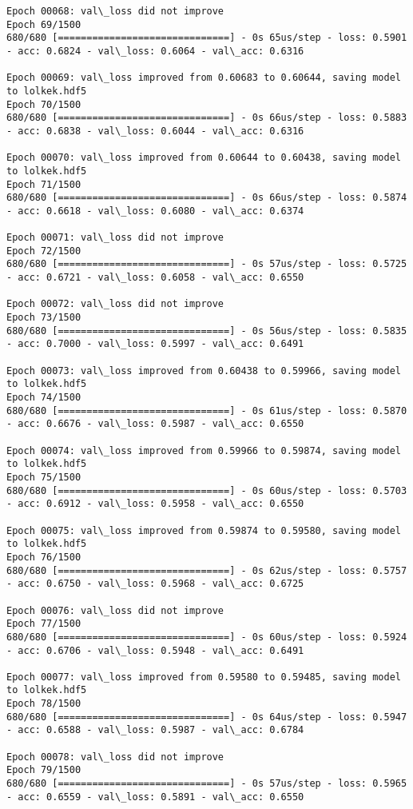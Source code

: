 \documentclass[11pt]{article}
\begin{document}
\begin{Verbatim}[commandchars=\\\{\}]
Epoch 00068: val\_loss did not improve
Epoch 69/1500
680/680 [==============================] - 0s 65us/step - loss: 0.5901 - acc: 0.6824 - val\_loss: 0.6064 - val\_acc: 0.6316

Epoch 00069: val\_loss improved from 0.60683 to 0.60644, saving model to lolkek.hdf5
Epoch 70/1500
680/680 [==============================] - 0s 66us/step - loss: 0.5883 - acc: 0.6838 - val\_loss: 0.6044 - val\_acc: 0.6316

Epoch 00070: val\_loss improved from 0.60644 to 0.60438, saving model to lolkek.hdf5
Epoch 71/1500
680/680 [==============================] - 0s 66us/step - loss: 0.5874 - acc: 0.6618 - val\_loss: 0.6080 - val\_acc: 0.6374

Epoch 00071: val\_loss did not improve
Epoch 72/1500
680/680 [==============================] - 0s 57us/step - loss: 0.5725 - acc: 0.6721 - val\_loss: 0.6058 - val\_acc: 0.6550

Epoch 00072: val\_loss did not improve
Epoch 73/1500
680/680 [==============================] - 0s 56us/step - loss: 0.5835 - acc: 0.7000 - val\_loss: 0.5997 - val\_acc: 0.6491

Epoch 00073: val\_loss improved from 0.60438 to 0.59966, saving model to lolkek.hdf5
Epoch 74/1500
680/680 [==============================] - 0s 61us/step - loss: 0.5870 - acc: 0.6676 - val\_loss: 0.5987 - val\_acc: 0.6550

Epoch 00074: val\_loss improved from 0.59966 to 0.59874, saving model to lolkek.hdf5
Epoch 75/1500
680/680 [==============================] - 0s 60us/step - loss: 0.5703 - acc: 0.6912 - val\_loss: 0.5958 - val\_acc: 0.6550

Epoch 00075: val\_loss improved from 0.59874 to 0.59580, saving model to lolkek.hdf5
Epoch 76/1500
680/680 [==============================] - 0s 62us/step - loss: 0.5757 - acc: 0.6750 - val\_loss: 0.5968 - val\_acc: 0.6725

Epoch 00076: val\_loss did not improve
Epoch 77/1500
680/680 [==============================] - 0s 60us/step - loss: 0.5924 - acc: 0.6706 - val\_loss: 0.5948 - val\_acc: 0.6491

Epoch 00077: val\_loss improved from 0.59580 to 0.59485, saving model to lolkek.hdf5
Epoch 78/1500
680/680 [==============================] - 0s 64us/step - loss: 0.5947 - acc: 0.6588 - val\_loss: 0.5987 - val\_acc: 0.6784

Epoch 00078: val\_loss did not improve
Epoch 79/1500
680/680 [==============================] - 0s 57us/step - loss: 0.5965 - acc: 0.6559 - val\_loss: 0.5891 - val\_acc: 0.6550


\end{Verbatim}
\end{document}
